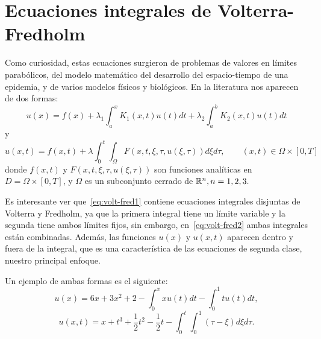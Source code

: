 \section{Ecuaciones integrales de Volterra-Fredholm}
Como curiosidad, estas ecuaciones surgieron de problemas de valores en límites parabólicos, del modelo matemático del desarrollo del espacio-tiempo de una epidemia, y de varios modelos físicos y biológicos. En la literatura nos aparecen de dos formas:
\begin{equation}\label{eq:volt-fred1}
	u(x) = f(x) + \lambda_1 \int_a^x K_1(x,t)u(t)dt + \lambda_2 \int_a^b K_2(x,t)u(t)dt
\end{equation}
y
\begin{equation}\label{eq:volt-fred2}
	u(x,t) = f(x,t) + \lambda \int_0^t \int_\Omega F(x,t,\xi, \tau, u(\xi, \tau))d\xi d\tau, \qquad (x,t) \in \Omega \times [0,T]
\end{equation}
donde $f(x,t)$ y $F(x,t,\xi, \tau, u(\xi, \tau))$ son funciones analíticas en $D = \Omega \times [0,T]$, y $\Omega$ es un subconjunto cerrado de $\mathbb{R}^n, n = 1,2,3.$

Es interesante ver que~\eqref{eq:volt-fred1} contiene ecuaciones integrales disjuntas de Volterra y Fredholm, ya que la primera integral tiene un límite variable y la segunda tiene ambos límites fijos, sin embargo, en~\eqref{eq:volt-fred2} ambas integrales están combinadas. Además, las funciones $u(x)$ y $u(x,t)$ aparecen dentro y fuera de la integral, que es una característica de las ecuaciones de segunda clase, nuestro principal enfoque.
\begin{ejemplo}
	Un ejemplo de ambas formas es el siguiente:
	\begin{equation}\label{}
		u(x) = 6x + 3x^2 + 2 - \int_0^x xu(t)dt - \int_0^1 tu(t)dt,
	\end{equation}
	\begin{equation}\label{}
		u(x,t) = x + t^3 + \dfrac{1}{2}t^2 - \dfrac{1}{2}t - \int_0^t \int_0^1 (\tau - \xi)d\xi d\tau.
	\end{equation}
\end{ejemplo}
